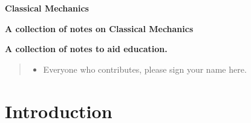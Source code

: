 \documentclass{report}
\author{Various}
\begin{document}
\begin{titlepage}
    \begin{center}
        \vspace*{1cm}
        \huge
        {\textbf{Classical Mechanics}}
        \vspace{2cm}
        \normalsize 

        \textbf{A collection of notes on Classical Mechanics}
        
        \vspace{2cm}
        \date{}
        \huge
        \textbf{}
        \normalsize

        \vfill
        
        \vspace{0.8cm}
        \vspace{0.8cm}
        \textbf{A collection of notes to aid education.}
    \end{center}
 \end{titlepage}

\thispagestyle{plain}
%        
%       
\newpage

\renewcommand{\abstractname}{Acknowledgements}
\begin{abstract}
\begin{itemize}
    \item Everyone who contributes, please sign your name here. 
\end{itemize}
\end{abstract}

\newpage
\tableofcontents
\newpage

\chapter{Introduction}


\printbibliography

%
\end{document}
